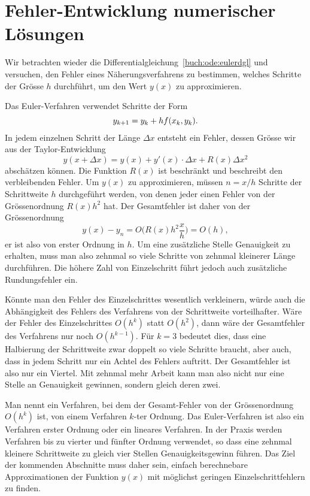%
%
%
\section{Fehler-Entwicklung numerischer Lösungen}
%
Wir betrachten wieder die Differentialgleichung~\eqref{buch:ode:eulerdgl}
und versuchen, den Fehler eines Näherungsverfahrens zu bestimmen,
welches Schritte der Grösse $h$ durchführt, um den Wert $y(x)$
zu approximieren.

Das Euler-Verfahren verwendet Schritte der Form
%
\[
y_{k+1}=y_{k\mathstrut} + hf(x_{k\mathstrut},y_{k\mathstrut}).
\]
In jedem einzelnen Schritt der Länge $\Delta x$
entsteht ein Fehler, dessen Grösse wir
aus der Taylor-Entwicklung
%
\[
y(x+\Delta x)
=
y(x) + y'(x)\cdot \Delta x + R(x) \Delta x^2
\]
abschätzen können.
Die Funktion $R(x)$ ist beschränkt und beschreibt den verbleibenden
Fehler.
Um $y(x)$ zu approximieren, müssen $n=x/h$ Schritte der Schrittweite
$h$ durchgeführt werden, von denen jeder einen Fehler
von der Grössenordnung $R(x)h^2$ hat.
Der Gesamtfehler ist daher von der Grössenordnung
\[
y(x)-y_n=O\biggl(R(x)h^2\frac{x}h\biggr)=O(h),
\]
er ist also von erster Ordnung in $h$.
Um eine zusätzliche Stelle Genauigkeit zu erhalten, muss man also zehnmal
so viele Schritte von zehnmal kleinerer Länge durchführen.
Die höhere Zahl von Einzelschritt führt jedoch 
auch zusätzliche Rundungsfehler ein.

Könnte man den Fehler des Einzelschrittes wesentlich verkleinern, würde
auch die Abhängigkeit des Fehlers des Verfahrens von der Schrittweite
vorteilhafter.
Wäre der Fehler des Einzelschrittes $O(h^k)$ statt $O(h^2)$, dann
wäre der Gesamtfehler des Verfahrens nur noch $O(h^{k-1})$.
Für $k=3$ bedeutet dies, dass eine Halbierung der Schrittweite
zwar doppelt so viele Schritte braucht, aber auch, dass in jedem
Schritt nur ein Achtel des Fehlers auftritt.
Der Gesamtfehler ist also nur ein Viertel.
Mit zehnmal mehr Arbeit kann man also nicht nur eine Stelle an
Genauigkeit gewinnen, sondern gleich deren zwei.

Man nennt ein Verfahren, bei dem der Gesamt-Fehler von der Grössenordnung
$O(h^k)$ ist, von einem Verfahren $k$-ter Ordnung.
%
Das Euler-Verfahren ist also ein Verfahren erster Ordnung oder ein
lineares Verfahren.
In der Praxis werden Verfahren bis zu vierter und fünfter Ordnung
verwendet, so dass eine zehnmal kleinere Schrittweite zu gleich
vier Stellen Genauigkeitsgewinn führen.
Das Ziel der kommenden Abschnitte muss daher sein, einfach
berechnebare Approximationen der Funktion $y(x)$ mit möglichst geringen
Einzelschrittfehlern zu finden.

